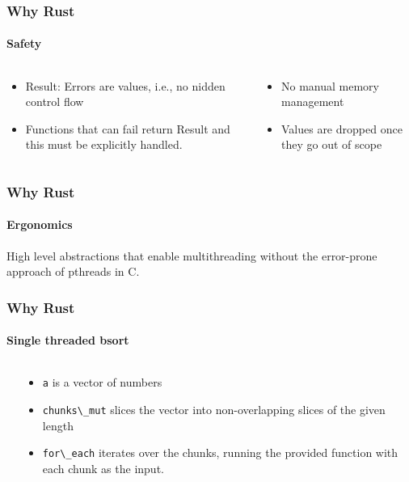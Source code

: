 \documentclass[aspectratio=169]{beamer}
\begin{document}
\begin{frame}
	\frametitle{Why Rust}
	\framesubtitle{Safety}

	\begin{columns}
		\begin{column}{0.4\textwidth}
			\begin{itemize}
				\item Result: Errors are values, i.e., no nidden control flow
				\item Functions that can fail return Result and this must be explicitly handled.
			\end{itemize}
		\end{column}
		\begin{column}{0.4\textwidth}
			\begin{itemize}
				\item No manual memory management
				\item Values are dropped once they go out of scope
			\end{itemize}
		\end{column}
	\end{columns}
\end{frame}

\begin{frame}
	\frametitle{Why Rust}
	\framesubtitle{Ergonomics}

	High level abstractions that enable multithreading without the error-prone approach of pthreads in C.
\end{frame}

\begin{frame}
	\frametitle{Why Rust}
	\framesubtitle{Single threaded bsort}
	\begin{columns}
		\begin{column}{ 0.5\textwidth }
			
		\end{column}
		\begin{column}{ 0.4\textwidth }
			\begin{itemize}
				\item \Verb|a| is a vector of numbers
				\item \Verb|chunks\_mut| slices the vector into non-overlapping slices of the given length
				\item \Verb|for\_each| iterates over the chunks, running the provided function with each chunk as the input.
			\end{itemize}
		\end{column}
	\end{columns}
\end{frame}
\end{document}
